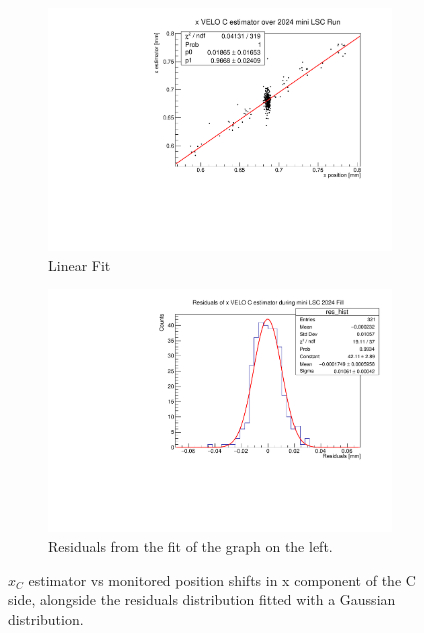 \begin{figure}
    \centering
    \begin{subfigure}{0.48\textwidth}
    \includegraphics[width=\linewidth]{figures/xVeloC_fit_comparison.pdf}
    \caption{Linear Fit}\label{fig:xCfit_comparison}
    \end{subfigure}
    \begin{subfigure}{0.48\textwidth}
    \includegraphics[width=\linewidth]{figures/xVeloC_res_comparison.pdf}
    \caption{Residuals from the fit of the graph on the left. }\label{fig:xCres_comparison}
    \end{subfigure}
    \caption{$\hat{x}_{C}$ estimator vs monitored position shifts in x component of the C side, alongside the residuals distribution fitted with a Gaussian distribution.}
    \label{fig:xC_comaprison}
\end{figure}
